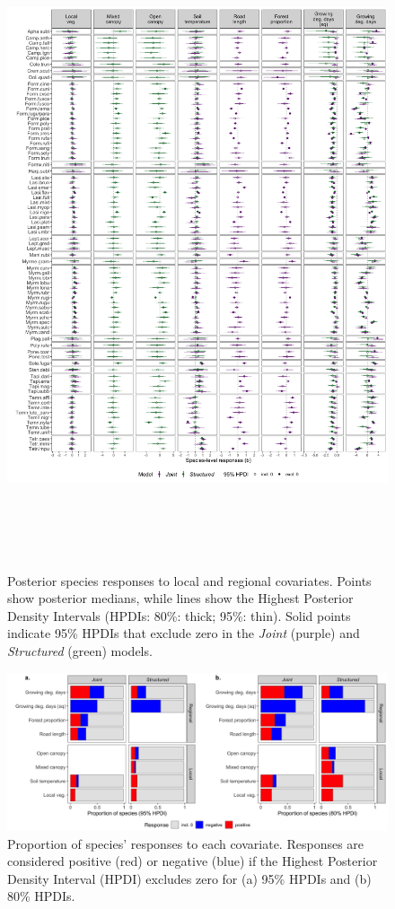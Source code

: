 \documentclass[preprint,final,times,12pt,3p]{elsarticle}
\begin{document}
\begin{figure}
	\centering\includegraphics[height=7.5in]{../../../ms/1_Ecography/1/figs/b_opt_byParam.png}
	\caption{\label{fig:b_byParam} Posterior species responses to local and regional covariates. Points show posterior medians, while lines show the Highest Posterior Density Intervals (HPDIs: 80\%: thick; 95\%: thin). Solid points indicate 95\% HPDIs that exclude zero in the \emph{Joint} (purple) and \emph{Structured} (green) models.}
\end{figure}

\begin{figure}
	\centering\includegraphics[width=6.5in]{../../../ms/1_Ecography/1/figs/b_opt_bar.png}
	\caption{\label{fig:b_bars} Proportion of species' responses to each covariate. Responses are considered positive (red) or negative (blue) if the Highest Posterior Density Interval (HPDI) excludes zero for (a) 95\% HPDIs and (b) 80\% HPDIs. }
\end{figure}
\end{document}
